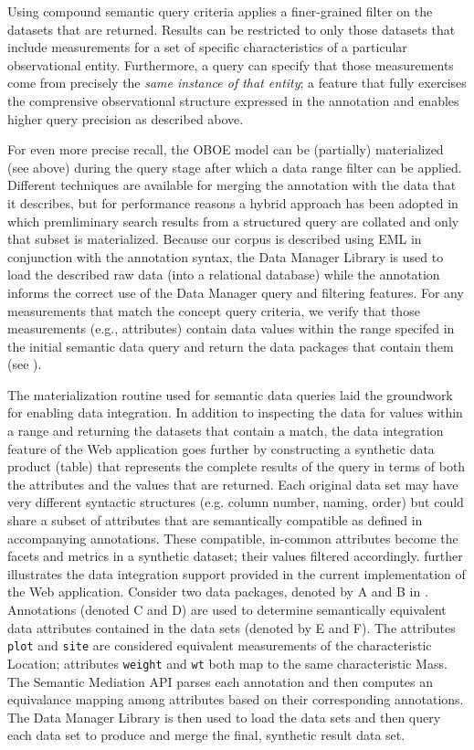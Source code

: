 Using compound semantic query criteria applies a finer-grained filter
on the datasets that are returned. Results can be restricted to only
those datasets that include measurements for a set of specific
characteristics of a particular observational entity. Furthermore, a
query can specify that those measurements come from precisely the
\emph{same instance of that entity}; a feature that fully exercises
the comprensive observational structure expressed in the annotation
and enables higher query precision as described above.

 For even more precise recall, the OBOE
model can be (partially) materialized (see above) during the query
stage after which a data range filter can be applied. Different
techniques are available for merging the annotation with the data that
it describes, but for performance reasons a hybrid approach has been
adopted in which premliminary search results from a structured query
are collated and only that subset is materialized. Because our corpus
is described using EML in conjunction with the annotation syntax, the
Data Manager Library \cite{leinfelder10} is used to load the described
raw data (into a relational database) while the annotation informs the
correct use of the Data Manager query and filtering features. For any
measurements that match the concept query criteria, we verify that
those measurements (e.g., attributes) contain data values within the
range specifed in the initial semantic data query and return the data
packages that contain them (see ). 

 The materialization routine used for
semantic data queries laid the groundwork for enabling data
integration. In addition to inspecting the data for values within a
range and returning the datasets that contain a match, the data
integration feature of the Web application goes further by
constructing a synthetic data product (table) that represents the
complete results of the query in terms of both the attributes and the
values that are returned. Each original data set may have very
different syntactic structures (e.g. column number, naming, order) but
could share a subset of attributes that are semantically compatible as
defined in accompanying annotations. These compatible, in-common
attributes become the facets and metrics in a synthetic dataset; their
values filtered accordingly.  further
illustrates the data integration support provided in the current
implementation of the Web application. Consider two data packages,
denoted by A and B in .  Annotations (denoted
C and D) are used to determine semantically equivalent data attributes
contained in the data sets (denoted by E and F). The attributes {\tt
  plot} and {\tt site} are considered equivalent measurements of the
characteristic Location; attributes {\tt weight} and {\tt wt} both map
to the same characteristic Mass. The Semantic Mediation API parses
each annotation and then computes an equivalance mapping among
attributes based on their corresponding annotations. The Data Manager
Library is then used to load the data sets and then query each data
set to produce and merge the final, synthetic result data set. 

